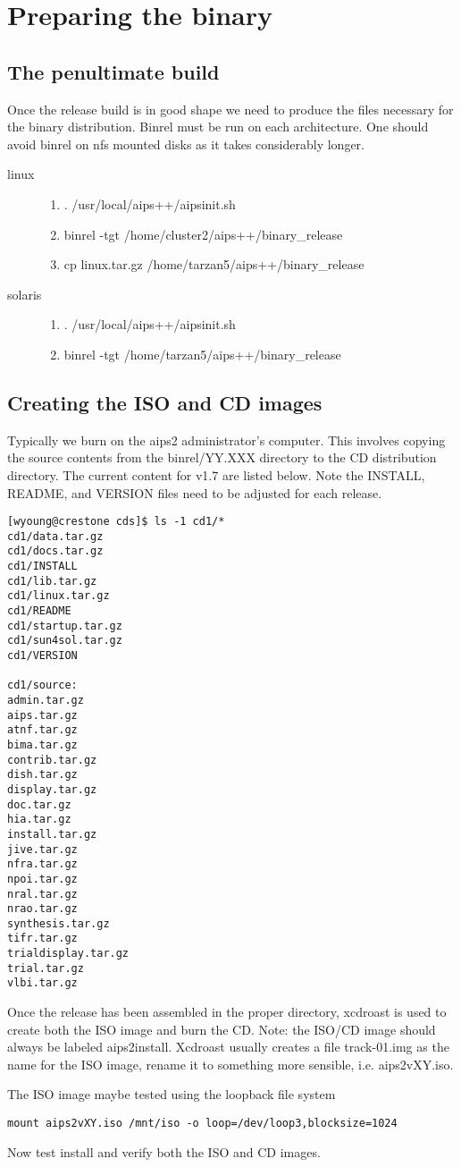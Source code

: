 \section{Preparing the binary}
\subsection{The penultimate build}
Once the release build is in good shape we need to produce the files necessary
for the binary distribution.  Binrel must be run on each architecture.  One should
avoid binrel on nfs mounted disks as it takes considerably longer.
\begin{description}
\item[linux] 
\begin{enumerate}
\item  . /usr/local/aips++/aipsinit.sh
\item binrel -tgt /home/cluster2/aips++/binary\_release
\item cp linux.tar.gz /home/tarzan5/aips++/binary\_release
\end{enumerate}
\item[solaris] 
\begin{enumerate}
\item  . /usr/local/aips++/aipsinit.sh
\item binrel -tgt /home/tarzan5/aips++/binary\_release
\end{enumerate}
\end{description}
\subsection{Creating the ISO and CD images}
Typically we burn on the aips2 administrator's computer.  This involves copying
the source contents from the binrel/YY.XXX directory to the CD distribution
directory. The current content for v1.7 are listed below.  Note the INSTALL,
README, and VERSION files need to be adjusted for each release.
\begin{verbatim}
[wyoung@crestone cds]$ ls -1 cd1/*
cd1/data.tar.gz
cd1/docs.tar.gz
cd1/INSTALL
cd1/lib.tar.gz
cd1/linux.tar.gz
cd1/README
cd1/startup.tar.gz
cd1/sun4sol.tar.gz
cd1/VERSION

cd1/source:
admin.tar.gz
aips.tar.gz
atnf.tar.gz
bima.tar.gz
contrib.tar.gz
dish.tar.gz
display.tar.gz
doc.tar.gz
hia.tar.gz
install.tar.gz
jive.tar.gz
nfra.tar.gz
npoi.tar.gz
nral.tar.gz
nrao.tar.gz
synthesis.tar.gz
tifr.tar.gz
trialdisplay.tar.gz
trial.tar.gz
vlbi.tar.gz

\end{verbatim}
Once the release has been assembled in the proper directory, xcdroast is used
to create both the ISO image and burn the CD.
Note: the ISO/CD image should always be labeled aips2install.  Xcdroast usually
creates a file track-01.img as the name for the ISO image, rename it to something
more sensible, i.e. aips2vXY.iso.

The ISO image maybe tested using the loopback file system

\begin{verbatim}
mount aips2vXY.iso /mnt/iso -o loop=/dev/loop3,blocksize=1024
\end{verbatim}

Now test install and verify both the ISO and CD images.
